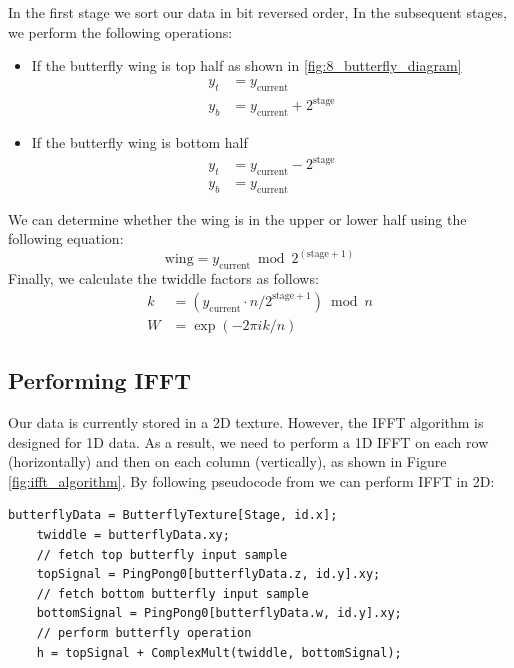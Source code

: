 In the first stage we sort our data in bit reversed order, In the subsequent stages, we perform the following operations:
\begin{itemize}
    \item If the butterfly wing is top half as shown in \ref{fig:8_butterfly_diagram}
    \begin{equation}
        \begin{split}
            y_t &= y_{\text{current}} \\
            y_b &= y_{\text{current}} + 2^{\text{stage}}
        \end{split}
    \end{equation}
    \item If the butterfly wing is bottom half
    \begin{equation}
        \begin{split}
            y_t &= y_{\text{current}} - 2^{\text{stage}} \\
            y_b &= y_{\text{current}}
        \end{split}
    \end{equation}
\end{itemize}
We can determine whether the wing is in the upper or lower half using the following equation:
\begin{equation}
    \text{wing} = y_{\text{current}} \bmod 2^{(\text{stage} + 1)}
\end{equation}
Finally, we calculate the twiddle factors as follows:
\begin{equation}
    \begin{split}
        k &= (y_{\text{current}} \cdot n / 2^{\text{stage} + 1}) \bmod n \\
        W &= \exp(-2\pi i k / n)
    \end{split}
\end{equation}

\subsection{Performing IFFT}
Our data is currently stored in a 2D texture. However, the IFFT algorithm is designed for 1D data. As a result, we need to perform a 1D IFFT on each row (horizontally) and then on each column (vertically), as shown in Figure \ref{fig:ifft_algorithm}.
By following pseudocode from \cite{flugge2017} we can perform IFFT in 2D:

\begin{lstlisting}[caption={Horizontal Butterfly Operation}, frame=single, numberstyle=\small\color{gray}, captionpos=b]
    butterflyData = ButterflyTexture[Stage, id.x];
    twiddle = butterflyData.xy;
    // fetch top butterfly input sample
    topSignal = PingPong0[butterflyData.z, id.y].xy;
    // fetch bottom butterfly input sample
    bottomSignal = PingPong0[butterflyData.w, id.y].xy;
    // perform butterfly operation
    h = topSignal + ComplexMult(twiddle, bottomSignal);
\end{lstlisting}

